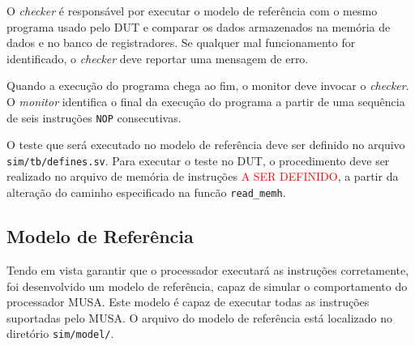 \documentclass{article}
\begin{document}
  O \textit{checker} é responsável por executar o modelo de referência com o mesmo programa usado pelo DUT e comparar os dados armazenados na memória de dados e no banco de registradores. Se qualquer mal funcionamento for identificado, o \textit{checker} deve reportar uma mensagem de erro.

  Quando a execução do programa chega ao fim, o monitor deve invocar o \textit{checker}. O \textit{monitor} identifica o final da execução do programa a partir de uma sequência de seis instruções \texttt{NOP} consecutivas.

	O teste que será executado no modelo de referência deve ser definido no arquivo \texttt{sim/tb/defines.sv}. Para executar o teste no DUT, o procedimento deve ser realizado no arquivo de memória de instruções \textcolor{red}{A SER DEFINIDO}, a partir da alteração do caminho especificado na funcão \texttt{read\_memh}.

	\subsection{Modelo de Referência}
  Tendo em vista garantir que o processador executará as instruções corretamente, foi desenvolvido um modelo de referência, capaz de simular o comportamento do processador MUSA. Este modelo é capaz de executar todas as instruções suportadas pelo MUSA. O arquivo do modelo de referência está localizado no diretório \texttt{sim/model/}.
	
\end{document}
